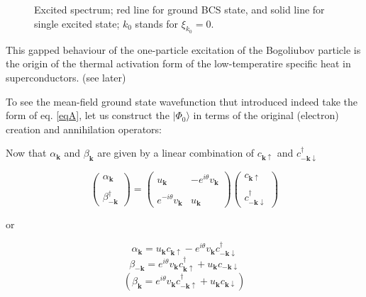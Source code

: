 ﻿\documentclass[twoside]{book}
\numberwithin{equation}{section}
\begin{document}
\begin{figure}
\begin{center}
\end{center}
\caption{Excited spectrum; red line for ground BCS state, and solid line for single excited state; $k_0$ stands for $\xi_{k_0} = 0$. }\label{Fig6.3}
\end{figure}

This gapped behaviour of the one-particle excitation of the Bogoliubov particle is the origin of the thermal activation form of the low-temperatire specific heat in superconductors. (see later)

To see the mean-field ground state wavefunction thut introduced indeed take the form of eq. \ref{eqA}, let us construct the $|\Phi_0\rangle$ in terms of the original (electron) creation and annihilation operators: 

Now that $\alpha_{\bm{k}}$ and $\beta_{\bm{k}}$ are given by a linear combination of $c_{\bm{k}\uparrow}$ and $c_{-\bm{k}\downarrow}^\dagger$

\[
\left(\begin{matrix}
\alpha_{\bm{k}}\\
\ \\
\beta_{-\bm{k}}^\dagger
\end{matrix}\right) = \left(\begin{matrix}
u_{\bm{k}} & -e^{i\theta}v_{\bm{k}}\\
\ & \ \\
e^{-i\theta}v_{\bm{k}} & u_{\bm{k}}
\end{matrix}\right) \left(\begin{matrix}
c_{\bm{k}\uparrow}\\
\ \\
c_{-\bm{k}\downarrow}^\dagger
\end{matrix}\right) 
 \]

or

\[\alpha_{\bm{k}} = u_{\bm{k}}c_{\bm{k}\uparrow} - e^{i\theta}v_{\bm{k}}c_{-\bm{k}\downarrow}^\dagger \]
\[\beta_{-\bm{k}} = e^{i\theta}v_{\bm{k}}c_{\bm{k}\uparrow}^\dagger + u_{\bm{k}}c_{-\bm{k}\downarrow} \]
\[(\beta_{\bm{k}} = e^{i\theta}v_{\bm{k}}c_{-\bm{k}\uparrow}^\dagger+u_{\bm{k}}c_{\bm{k}\downarrow}) \]
\end{document}
